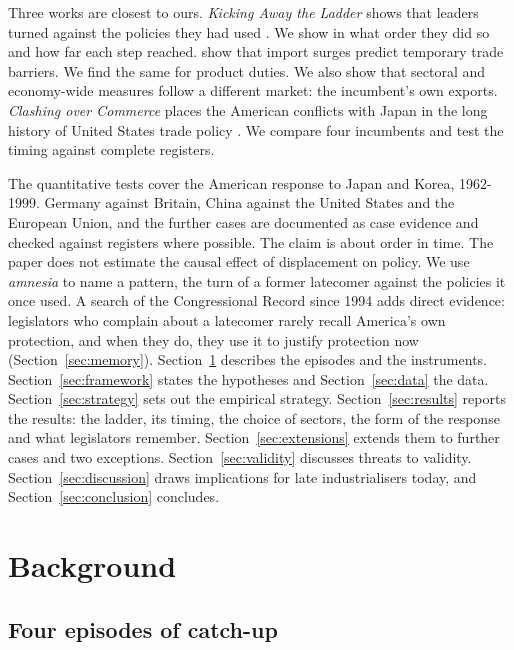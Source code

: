 \documentclass[review,authoryear,12pt]{elsarticle}
\begin{document}
Three works are closest to ours. \emph{Kicking Away the Ladder} shows that leaders turned against the policies they had used \citep{chang2002}. We show in what order they did so and how far each step reached. \citet{bown2013aer} show that import surges predict temporary trade barriers. We find the same for product duties. We also show that sectoral and economy-wide measures follow a different market: the incumbent's own exports. \emph{Clashing over Commerce} places the American conflicts with Japan in the long history of United States trade policy \citep{irwin2017}. We compare four incumbents and test the timing against complete registers.

The quantitative tests cover the American response to Japan and Korea, 1962-1999. Germany against Britain, China against the United States and the European Union, and the further cases are documented as case evidence and checked against registers where possible. The claim is about order in time. The paper does not estimate the causal effect of displacement on policy. We use \emph{amnesia} to name a pattern, the turn of a former latecomer against the policies it once used. A search of the Congressional Record since 1994 adds direct evidence: legislators who complain about a latecomer rarely recall America's own protection, and when they do, they use it to justify protection now (Section~\ref{sec:memory}). Section~\ref{sec:background} describes the episodes and the instruments. Section~\ref{sec:framework} states the hypotheses and Section~\ref{sec:data} the data. Section~\ref{sec:strategy} sets out the empirical strategy. Section~\ref{sec:results} reports the results: the ladder, its timing, the choice of sectors, the form of the response and what legislators remember. Section~\ref{sec:extensions} extends them to further cases and two exceptions. Section~\ref{sec:validity} discusses threats to validity. Section~\ref{sec:discussion} draws implications for late industrialisers today, and Section~\ref{sec:conclusion} concludes.

\section{Background}\label{sec:background}

\subsection{Four episodes of catch-up}
\end{document}
